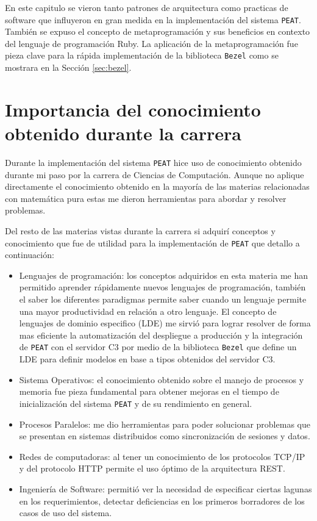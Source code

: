 En este capitulo se vieron tanto patrones de arquitectura como practicas de software
que influyeron en gran medida en la implementación del sistema \texttt{PEAT}.
También se expuso el concepto de metaprogramación y sus beneficios en contexto del
lenguaje de programación Ruby. La aplicación de la metaprogramación fue pieza clave
para la rápida implementación de la biblioteca \texttt{Bezel} como se mostrara en la
Sección \ref{sec:bezel}.

\section{Importancia del conocimiento obtenido durante la carrera}

Durante la implementación del sistema \texttt{PEAT} hice uso de conocimiento obtenido
durante mi paso por la carrera de Ciencias de Computación. Aunque no aplique
directamente el conocimiento obtenido en la mayoría de las materias relacionadas
con matemática pura estas me dieron herramientas para abordar y resolver problemas.

Del resto de las materias vistas durante la carrera si adquirí conceptos y
conocimiento que fue de utilidad para la implementación de \texttt{PEAT} que
detallo a continuación:

\begin{itemize}
\item Lenguajes de programación: los conceptos adquiridos en esta materia me
  han permitido aprender rápidamente nuevos lenguajes de programación, también
  el saber los diferentes paradigmas permite saber cuando un lenguaje permite
  una mayor productividad en relación a otro lenguaje. El concepto de lenguajes
  de dominio especifico (LDE) me sirvió para lograr resolver de forma mas
  eficiente la automatización del despliegue a producción y la integración de
  \texttt{PEAT} con el servidor C3 por medio de la biblioteca \texttt{Bezel} que
  define un LDE para definir modelos en base a tipos obtenidos del servidor C3.
\item Sistema Operativos: el conocimiento obtenido sobre el manejo de procesos
  y memoria fue pieza fundamental para obtener mejoras en el tiempo de inicialización
  del sistema \texttt{PEAT} y de su rendimiento en general.
\item Procesos Paralelos: me dio herramientas para poder solucionar problemas
  que se presentan en sistemas distribuidos como sincronización de sesiones y
  datos.
\item Redes de computadoras: al tener un conocimiento de los protocolos
  TCP/IP y del protocolo HTTP permite el uso óptimo de la arquitectura REST.
\item Ingeniería de Software: permitió ver la necesidad de especificar
  ciertas lagunas en los requerimientos, detectar deficiencias en los primeros
  borradores de los casos de uso del sistema.
\end{itemize}
